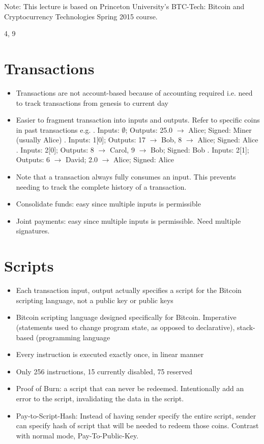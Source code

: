 \documentclass{article}
\begin{document}
\maketitle

Note: This lecture is based on Princeton University's BTC-Tech: Bitcoin and Cryptocurrency Technologies Spring 2015 course.

4, 9

\section{Transactions}
\begin{itemize}
\item Transactions are not account-based because of accounting required i.e. need to track transactions from genesis to current day
\item Easier to fragment transaction into inputs and outputs. Refer to specific coins in past transactions e.g.
. Inputs: $\emptyset$; Outputs: 25.0 $\rightarrow$ Alice; Signed: Miner (usually Alice)
. Inputs: 1[0]; Outputs: 17 $\rightarrow$ Bob, 8 $\rightarrow$ Alice; Signed: Alice
. Inputs: 2[0]; Outputs: 8 $\rightarrow$ Carol, 9 $\rightarrow$ Bob; Signed: Bob
. Inputs: 2[1]; Outputs: 6 $\rightarrow$ David; 2.0 $\rightarrow$ Alice; Signed: Alice
\item Note that a transaction always fully consumes an input. This prevents needing to track the complete history of a transaction.
\item Consolidate funds: easy since multiple inputs is permissible
\item Joint payments: easy since multiple inputs is permissible. Need multiple signatures.
\end{itemize}

\section{Scripts}
\begin{itemize}
\item Each transaction input, output actually specifies a script for the Bitcoin scripting language, not a public key or public keys
\item Bitcoin scripting language designed specifically for Bitcoin. Imperative (statements used to change program state, as opposed to declarative), stack-based (programming language
\item Every instruction is executed exactly once, in linear manner
\item Only 256 instructions, 15 currently disabled, 75 reserved
\item Proof of Burn: a script that can never be redeemed. Intentionally add an error to the script, invalidating the data in the script.
\item Pay-to-Script-Hash: Instead of having sender specify the entire script, sender can specify hash of script that will be needed to redeem those coins. Contrast with normal mode, Pay-To-Public-Key.
\end{itemize}
\end{document}

